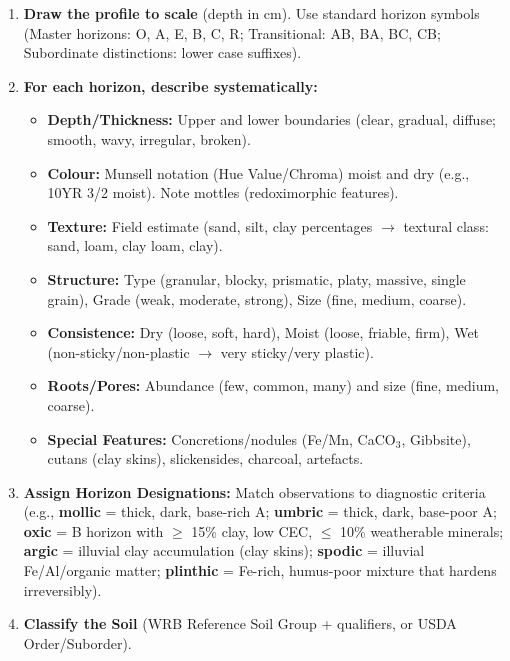 \documentclass[11pt]{article}
\begin{document}
\begin{methode}
\begin{enumerate}
\item \textbf{Draw the profile to scale} (depth in cm). Use standard horizon symbols (Master horizons: O, A, E, B, C, R; Transitional: AB, BA, BC, CB; Subordinate distinctions: lower case suffixes).
\item \textbf{For each horizon, describe systematically:}
      \begin{itemize}
      \item \textbf{Depth/Thickness:} Upper and lower boundaries (clear, gradual, diffuse; smooth, wavy, irregular, broken).
      \item \textbf{Colour:} Munsell notation (Hue Value/Chroma) moist and dry (e.g., 10YR 3/2 moist). Note mottles (redoximorphic features).
      \item \textbf{Texture:} Field estimate (sand, silt, clay percentages $\rightarrow$ textural class: sand, loam, clay loam, clay).
      \item \textbf{Structure:} Type (granular, blocky, prismatic, platy, massive, single grain), Grade (weak, moderate, strong), Size (fine, medium, coarse).
      \item \textbf{Consistence:} Dry (loose, soft, hard), Moist (loose, friable, firm), Wet (non-sticky/non-plastic $\rightarrow$ very sticky/very plastic).
      \item \textbf{Roots/Pores:} Abundance (few, common, many) and size (fine, medium, coarse).
      \item \textbf{Special Features:} Concretions/nodules (Fe/Mn, CaCO$_3$, Gibbsite), cutans (clay skins), slickensides, charcoal, artefacts.
      \end{itemize}
\item \textbf{Assign Horizon Designations:} Match observations to diagnostic criteria (e.g., \textbf{mollic} = thick, dark, base-rich A; \textbf{umbric} = thick, dark, base-poor A; \textbf{oxic} = B horizon with $\ge$ 15\% clay, low CEC, $\le$ 10\% weatherable minerals; \textbf{argic} = illuvial clay accumulation (clay skins); \textbf{spodic} = illuvial Fe/Al/organic matter; \textbf{plinthic} = Fe-rich, humus-poor mixture that hardens irreversibly).
\item \textbf{Classify the Soil} (WRB Reference Soil Group + qualifiers, or USDA Order/Suborder).
\end{enumerate}
\end{methode}
\end{document}
